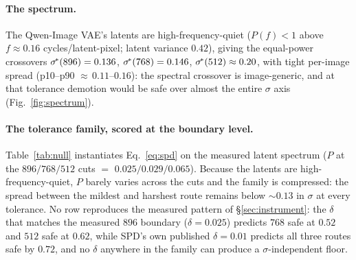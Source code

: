 \paragraph{The spectrum.}
The Qwen-Image VAE's latents are high-frequency-quiet ($P(f) < 1$ above
$f \approx 0.16$ cycles/latent-pixel; latent variance $0.42$), giving the
equal-power crossovers $\sigma^{\!*}(896) = 0.136$,
$\sigma^{\!*}(768) = 0.146$, $\sigma^{\!*}(512) \approx 0.20$, with tight
per-image spread (p10--p90 ${\approx}\,0.11$--$0.16$): the spectral
crossover is image-generic, and at that tolerance demotion would be safe
over almost the entire $\sigma$ axis (Fig.~\ref{fig:spectrum}).

\paragraph{The tolerance family, scored at the boundary level.}
Table~\ref{tab:null} instantiates Eq.~\ref{eq:spd} on the measured
latent spectrum ($P$ at the $896/768/512$ cuts $=$
$0.025/0.029/0.065$). Because the latents are high-frequency-quiet, $P$
barely varies across the cuts and the family is compressed: the spread
between the mildest and harshest route remains below ${\sim}0.13$ in
$\sigma$ at every tolerance. No row reproduces the measured pattern of
\S\ref{sec:instrument}: the $\delta$ that matches the measured $896$
boundary ($\delta = 0.025$) predicts $768$ safe at $0.52$ and $512$
safe at $0.62$, while SPD's own published $\delta = 0.01$ predicts all
three routes safe by $0.72$, and no $\delta$ anywhere in the family
can produce a $\sigma$-independent floor.

